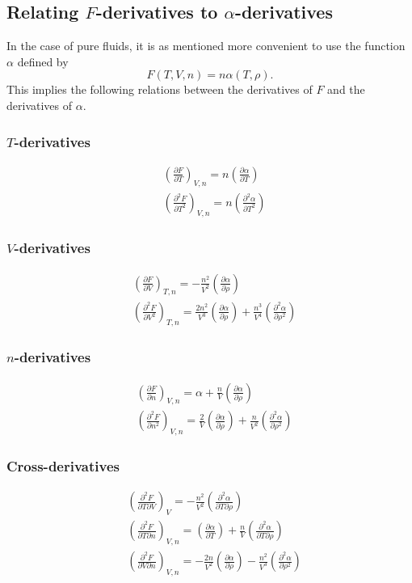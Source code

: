 \documentclass[internal,english]{sintefmemo2012}
\newcommand*{\pder}[2]{\left(\frac{\partial #1}{\partial #2}\right)}
\newcommand*{\pdder}[2]{\left(\frac{\partial^2 #1}{\partial #2^2}\right)}
\newcommand*{\pdcross}[3]{\left(\frac{\partial^2 #1}{\partial #2 \partial #3}\right)}
\numberwithin{equation}{section}
\begin{document}
\subsection{Relating $F$-derivatives to $\alpha$-derivatives}
In the case of pure fluids, it is as mentioned more convenient to use
the function $\alpha$ defined by
\begin{equation}
  F(T,V,n) = n \alpha(T, \rho).
\end{equation}
This implies the following relations between the derivatives of $F$
and the derivatives of $\alpha$.

\subsubsection*{$T$-derivatives}
\begin{align}
  \label{eq:DFDT}
  & \pder{F}{T}_{V, n} = n \pder{\alpha}{T} \\
  \label{eq:D2FDT2}
  & \pdder{F}{T}_{V, n} = n \pdder{\alpha}{T}
\end{align}

\subsubsection*{$V$-derivatives}
\begin{align}
  \label{eq:DFDV}
  & \pder{F}{V}_{T, n} = -\frac{n^2}{V^2} \pder{\alpha}{\rho} \\
  \label{eq:D2FDV2}
  & \pdder{F}{V}_{T, n} = \frac{2n^2}{V^3} \pder{\alpha}{\rho} +
  \frac{n^3}{V^4} \pdder{\alpha}{\rho}
\end{align}

\subsubsection*{$n$-derivatives}
\begin{align}
  \label{eq:DFDn}
  & \pder{F}{n}_{V, n} = \alpha + \frac{n}{V}\pder{\alpha}{\rho} \\
  \label{eq:D2FDn2}
  & \pdder{F}{n}_{V, n} = \frac{2}{V} \pder{\alpha}{\rho} +
  \frac{n}{V^2} \pdder{\alpha}{\rho}
\end{align}

\subsubsection*{Cross-derivatives}
\begin{align}
  \label{eq:D2FDTV}
  & \pdcross{F}{T}{V}_{V} = -\frac{n^2}{V^2} \pdcross{\alpha}{T}{\rho} \\
  \label{eq:D2FDTn}
  & \pdcross{F}{T}{n}_{V, n} = \pder{\alpha}{T} + \frac{n}{V} \pdcross{\alpha}{T}{\rho} \\
  \label{eq:D2FDVn}
  & \pdcross{F}{V}{n}_{V, n} = -\frac{2n}{V^2} \pder{\alpha}{\rho} -
  \frac{n^2}{V^3} \pdder{\alpha}{\rho}
\end{align}
\end{document}
